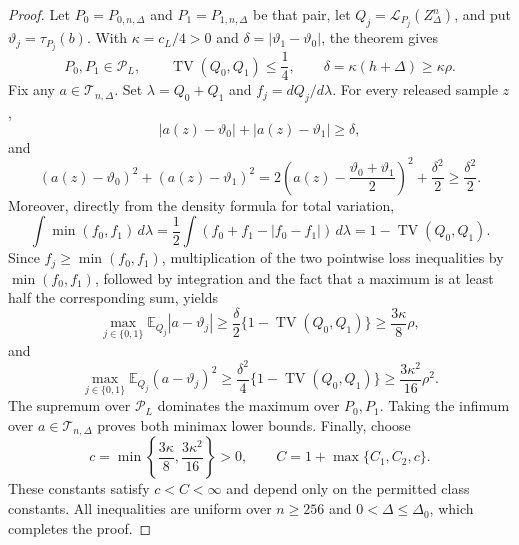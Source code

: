 \documentclass{article}
\begin{document}
\begin{proof}
Let \(P_0=P_{0,n,\Delta}\) and \(P_1=P_{1,n,\Delta}\) be that pair, let \(Q_j=\mathcal L_{P_j}(Z_\Delta^n)\), and put \(\vartheta_j=\tau_{P_j}(b)\).  With \(\kappa=c_L/4>0\) and \(\delta=|\vartheta_1-\vartheta_0|\), the theorem gives
\[
 P_0,P_1\in\mathcal P_L,
 \qquad
 \operatorname{TV}(Q_0,Q_1)\leq\frac14,
 \qquad
 \delta=\kappa(h+\Delta)\geq\kappa\rho.
\]
Fix any \(a\in\mathcal T_{n,\Delta}\).  Set \(\lambda=Q_0+Q_1\) and \(f_j=dQ_j/d\lambda\).  For every released sample \(z\),
\[
 |a(z)-\vartheta_0|+|a(z)-\vartheta_1|\geq\delta,
\]
and
\[
 (a(z)-\vartheta_0)^2+(a(z)-\vartheta_1)^2
 =2\left(a(z)-\frac{\vartheta_0+\vartheta_1}{2}\right)^2+\frac{\delta^2}{2}
 \geq\frac{\delta^2}{2}.
\]
Moreover, directly from the density formula for total variation,
\[
 \int\min(f_0,f_1)\,d\lambda
 =\frac12\int(f_0+f_1-|f_0-f_1|)\,d\lambda
 =1-\operatorname{TV}(Q_0,Q_1).
\]
Since \(f_j\geq\min(f_0,f_1)\), multiplication of the two pointwise loss inequalities by \(\min(f_0,f_1)\), followed by integration and the fact that a maximum is at least half the corresponding sum, yields
\[
 \max_{j\in\{0,1\}}\mathbb E_{Q_j}|a-\vartheta_j|
 \geq\frac\delta2\{1-\operatorname{TV}(Q_0,Q_1)\}
 \geq\frac{3\kappa}{8}\rho,
\]
and
\[
 \max_{j\in\{0,1\}}\mathbb E_{Q_j}(a-\vartheta_j)^2
 \geq\frac{\delta^2}{4}\{1-\operatorname{TV}(Q_0,Q_1)\}
 \geq\frac{3\kappa^2}{16}\rho^2.
\]
The supremum over \(\mathcal P_L\) dominates the maximum over \(P_0,P_1\).  Taking the infimum over \(a\in\mathcal T_{n,\Delta}\) proves both minimax lower bounds.  Finally, choose
\[
 c=\min\left\{\frac{3\kappa}{8},\frac{3\kappa^2}{16}\right\}>0,
 \qquad
 C=1+\max\{C_1,C_2,c\}.
\]
These constants satisfy \(c<C<\infty\) and depend only on the permitted class constants.  All inequalities are uniform over \(n\geq256\) and \(0<\Delta\leq\Delta_0\), which completes the proof.
\end{proof}
\end{document}
